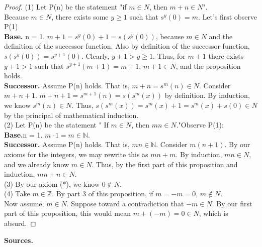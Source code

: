\documentclass[12pt]{amsart}
\newcommand{\N}{\mathbb{N}}
\newcommand{\Z}{\mathbb{Z}}
\begin{document}
\begin{proof}
	(1) Let P(n) be the statement "if $m \in N$, then $m + n \in N$".\\Because $m \in N$, there exists some $y \geq 1$ such that $ s^y(0) = m$. Let's first observe P(1)
	\\\textbf{Base.} n = 1. $m + 1 = s^y(0) + 1 = s(s^y(0))$, because $m \in N$ and the definition of the successor function. Also by definition of the successor function, $s(s^y(0)) = s^{y+1}(0)$. Clearly, $y+1 > y \geq 1$. Thus, for $m+1$ there exists $y+1 > 1$ such that $s^{y+1}(m+1) = m+1$, $m+1 \in N$, and the proposition holds.
	\\\textbf{Successor.} Assume P(n) holds. That is, $m + n  = s^m(n) \in N$. Consider $m + n + 1$. $m + n + 1 = s^{m+1}(n) = s(s^m(x))$ by definition. By induction, we know $s^m(n) \in N$. Thus, $s(s^m(x)) = s^m(x) + 1 = s^m(x) + s(0) \in N$ by the principal of mathematical induction.
	\\\indent (2) Let P(n) be the statement " If $m \in N$, then $mn \in N$."Observe P(1):
	\\\textbf{Base.}n = 1. $m \cdot 1 = m \in \N$.
	\\\textbf{Successor.} Assume P(n) holds. That is, $mn \in \N$. Consider $m(n+1)$. By our axioms for the integers, we may rewrite this as $mn + m$. By induction, $mn \in N$, and we already know $m \in N$. Thus, by the first part of this proposition and induction, $mn + n \in N$.
	\\\indent (3) By our axiom ($\ast$), we know $0 \notin N$.
	\\\indent (4) Take $m \in \Z$. By part 3 of this proposition, if $m  = - m = 0$, $m \notin N$.
	\\\indent Now assume, $m \in N$. Suppose toward a contradiction that $- m \in N$. By our first part of this proposition, this would mean $m + (- m) = 0 \in N$, which is absurd.
\end{proof}
\textbf{Sources.}
\end{document}
